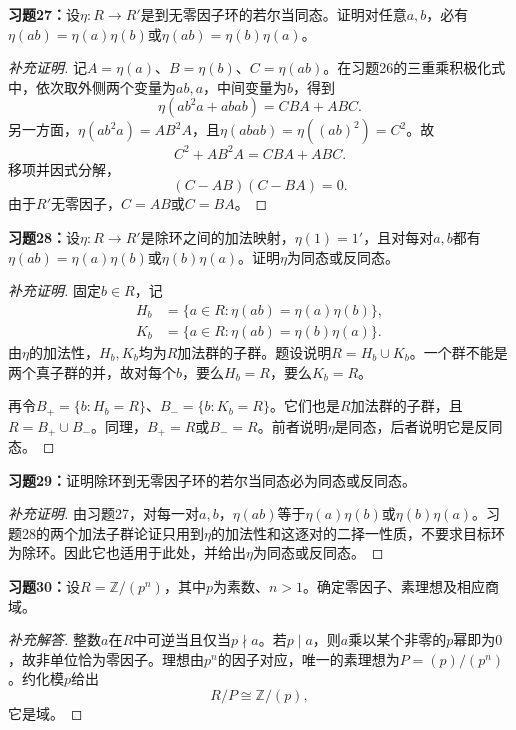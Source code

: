 \begin{problem}
\textbf{习题27：}设$\eta:R\to R'$是到无零因子环的若尔当同态。证明对任意$a,b$，必有$\eta(ab)=\eta(a)\eta(b)$或$\eta(ab)=\eta(b)\eta(a)$。
\end{problem}
\begin{proof}[补充证明]
记$A=\eta(a)$、$B=\eta(b)$、$C=\eta(ab)$。在习题26的三重乘积极化式中，依次取外侧两个变量为$ab,a$，中间变量为$b$，得到
\[
\eta(ab^2a+abab)=CBA+ABC.
\]
另一方面，$\eta(ab^2a)=AB^2A$，且$\eta(abab)=\eta((ab)^2)=C^2$。故
\[
C^2+AB^2A=CBA+ABC.
\]
移项并因式分解，
\[
(C-AB)(C-BA)=0.
\]
由于$R'$无零因子，$C=AB$或$C=BA$。
\end{proof}

\begin{problem}
\textbf{习题28：}设$\eta:R\to R'$是除环之间的加法映射，$\eta(1)=1'$，且对每对$a,b$都有$\eta(ab)=\eta(a)\eta(b)$或$\eta(b)\eta(a)$。证明$\eta$为同态或反同态。
\end{problem}
\begin{proof}[补充证明]
固定$b\in R$，记
\begin{align*}
H_b&=\{a\in R:\eta(ab)=\eta(a)\eta(b)\},\\
K_b&=\{a\in R:\eta(ab)=\eta(b)\eta(a)\}.
\end{align*}
由$\eta$的加法性，$H_b,K_b$均为$R$加法群的子群。题设说明$R=H_b\cup K_b$。一个群不能是两个真子群的并，故对每个$b$，要么$H_b=R$，要么$K_b=R$。

再令$B_+=\{b:H_b=R\}$、$B_-=\{b:K_b=R\}$。它们也是$R$加法群的子群，且$R=B_+\cup B_-$。同理，$B_+=R$或$B_-=R$。前者说明$\eta$是同态，后者说明它是反同态。
\end{proof}

\begin{problem}
\textbf{习题29：}证明除环到无零因子环的若尔当同态必为同态或反同态。
\end{problem}
\begin{proof}[补充证明]
由习题27，对每一对$a,b$，$\eta(ab)$等于$\eta(a)\eta(b)$或$\eta(b)\eta(a)$。习题28的两个加法子群论证只用到$\eta$的加法性和这逐对的二择一性质，不要求目标环为除环。因此它也适用于此处，并给出$\eta$为同态或反同态。
\end{proof}

\begin{problem}
\textbf{习题30：}设$R=\mathbb Z/(p^n)$，其中$p$为素数、$n>1$。确定零因子、素理想及相应商域。
\end{problem}
\begin{proof}[补充解答]
整数$a$在$R$中可逆当且仅当$p\nmid a$。若$p\mid a$，则$a$乘以某个非零的$p$幂即为$0$，故非单位恰为零因子。理想由$p^n$的因子对应，唯一的素理想为$P=(p)/(p^n)$。约化模$p$给出
\[
R/P\cong\mathbb Z/(p),
\]
它是域。
\end{proof}

